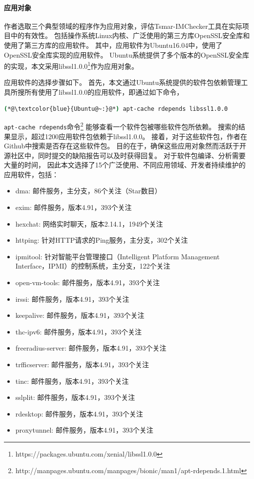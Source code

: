 \paragraph{应用对象}
作者选取三个典型领域的程序作为应用对象，评估Tsmar-IMChecker工具在实际项目中的有效性。
包括操作系统Linux内核、广泛使用的第三方库OpenSSL安全库和
使用了第三方库的应用软件。
其中，应用软件为Ubuntu16.04中，使用了OpenSSL安全库实现的应用软件。
Ubuntu系统提供了多个版本的OpenSSL安全库的实现，本文采用libssl1.0.0\footnote{https://packages.ubuntu.com/xenial/libssl1.0.0}作为应用对象。

应用软件的选择步骤如下。
首先，本文通过Ubuntu系统提供的软件包依赖管理工具所搜所有使用了libssl1.0.0的应用软件，即通过如下命令，
\begin{lstlisting}[language={bash},
basicstyle=\linespread{0.8}\listingsfont,
numbers=none,
xleftmargin=.25\textwidth]
(*@\textcolor{blue}{Ubuntu@~:}@*) apt-cache rdepends libssl1.0.0
\end{lstlisting}
\texttt{apt-cache rdepends}命令\footnote{http://manpages.ubuntu.com/manpages/bionic/man1/apt-rdepends.1.html}
能够查看一个软件包被哪些软件包所依赖。
搜索的结果显示，超过1200应用软件包依赖于libssl1.0.0。
接着，对于这些软件包，作者在Github中搜索是否存在这些软件包。
目的在于，确保这些应用对象然而活跃于开源社区中，同时提交的缺陷报告可以及时获得回复。
对于软件包编译、分析需要大量的时间，
因此本文选择了15个广泛使用、不同应用领域、开发者持续维护的应用软件，包括：
\begin{itemize}
	\item dma: 邮件服务，主分支，86个关注（Star数目）
	\item exim: 邮件服务，版本4.91，393个关注
	\item hexchat: 网络实时聊天，版本2.14.1，1949个关注
	\item httping: 针对HTTP请求的Ping服务，主分支，302个关注
	\item ipmitool: 针对智能平台管理接口（Intelligent Platform Management Interface，IPMI）的控制系统，主分支，122个关注
	\item open-vm-tools: 邮件服务，版本4.91，393个关注
	\item irssi: 邮件服务，版本4.91，393个关注
	\item keepalive: 邮件服务，版本4.91，393个关注
	\item thc-ipv6: 邮件服务，版本4.91，393个关注
	\item freeradius-server: 邮件服务，版本4.91，393个关注
	\item trfficserver: 邮件服务，版本4.91，393个关注
	\item tinc: 邮件服务，版本4.91，393个关注
	\item sslplit: 邮件服务，版本4.91，393个关注
	\item rdesktop: 邮件服务，版本4.91，393个关注
	\item proxytunnel: 邮件服务，版本4.91，393个关注
\end{itemize}

